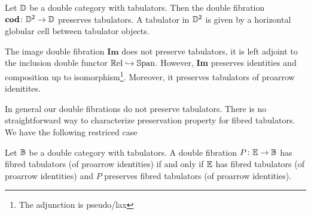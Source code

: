 \documentclass[9pt, leqno]{amsart}
\begin{document}

\begin{example}
	Let $\mathbb{D}$ be a double category with tabulators. Then the double fibration $\textbf{cod} \colon \mathbb{D}^2 \to \mathbb{D}$ preserves tabulators. A tabulator in $\mathbb{D}^2$ is given by a horizontal globular cell between tabulator objects. 
\end{example}

\begin{example}
	The image double fibration $\textbf{Im}$ does not preserve tabulators, it is left adjoint to the inclusion double functor $\mathbb{R}\text{el} \hookrightarrow \operatorname{\mathbb{S}\text{pan}}$. However, \textbf{Im} preserves identities and composition up to isomorphism\footnote{The adjunction is pseudo/lax}. Moreover, it preserves tabulators of proarrow idenitites.
\end{example} 

\vspace{1cm}
In general our double fibrations do not preserve tabulators. There is no straightforward way to characterize preservation property for fibred tabulators. We have the following restriced case
\begin{thm}
	Let $\mathbb{B}$ be a double category with tabulators. A double fibration $P \colon \mathbb{E} \to \mathbb{B}$ has fibred tabulators (of proarrow identities) if and only if $\mathbb{E}$ has fibred tabulators (of proarrow identities) and $P$ preserves fibred tabulators (of proarrow identities).
\end{thm}
\end{document}
